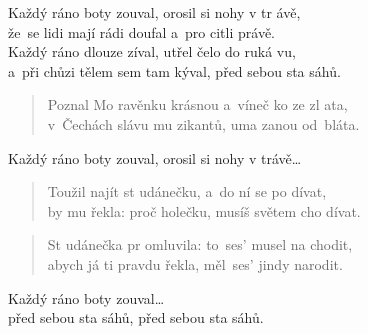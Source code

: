 \begin{song}{}
\begin{refren}
   Každý ráno boty zouval, orosil si nohy v tr ávě, \\
   že~se lidi mají rádi doufal a~pro citli právě. \\
   Každý ráno dlouze zíval, utřel čelo do ruká vu, \\
   a~při chůzi tělem sem tam kýval, před sebou sta sáhů.
\end{refren}
\begin{verse}
   Poznal Mo ravěnku krásnou a~víneč ko ze zl ata, \\
   v~Čechách slávu mu zikantů, uma zanou od~bláta.
\end{verse}
\begin{refren}
   Každý ráno boty zouval, orosil si nohy v trávě\ldots
\end{refren}
\begin{verse}
   Toužil najít st udánečku, a~do ní se po dívat, \\
   by mu řekla: proč holečku, musíš světem cho dívat.
\end{verse}
\begin{verse}
   St udánečka pr omluvila: to~ses' musel na chodit, \\
   abych já ti pravdu řekla, měl~ses' jindy narodit.
\end{verse}
\begin{refren}
   Každý ráno boty zouval\ldots \\ %
   před sebou sta sáhů, před sebou sta sáhů.
\end{refren}
\end{song}
\pagebreak
